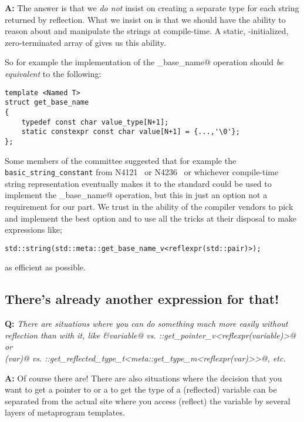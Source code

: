 \textbf{A:} The answer is that we {\em do not} insist on creating a separate
type for each string returned by reflection. What we insist on is that we
should have the ability to reason about and manipulate the strings at compile-time.
A static, \verb@constexpr@-initialized, zero-terminated array of \verb@char@s
gives us this ability.

So for example the implementation of the \verb@get_base_name@ operation should
{\em be equivalent} to the following:

\begin{verbatim}
template <Named T>
struct get_base_name
{
	typedef const char value_type[N+1];
	static constexpr const char value[N+1] = {...,'\0'};
};
\end{verbatim}

Some members of the committee suggested that for example the
\texttt{basic\_string\_constant} from N4121~\cite{ISOCPP-N4121} or
N4236~\cite{ISOCPP-N4236} or whichever compile-time
string representation eventually makes it to the standard could
be used to implement the \verb@get_base_name@ operation,
but this in just an option not a requirement for our part.
We trust in the ability of the compiler vendors to pick and
implement the best option and to use all the tricks at their disposal
to make expressions like;

\begin{verbatim}
std::string(std::meta::get_base_name_v<reflexpr(std::pair)>);
\end{verbatim}

as efficient as possible.

\subsection{There's already another expression for that!}

\textbf{Q:} {\em There are situations where you can do something much more
easily without reflection than with it, like \verb@&variable@ vs.
\verb@meta::get_pointer_v<reflexpr(variable)>@ or\\\verb@decltype(var)@ vs.
\verb@meta::get_reflected_type_t<meta::get_type_m<reflexpr(var)>>@, etc.}

\textbf{A:} Of course there are! There are also situations where the decision
that you want to get a pointer to or a to get the type of a (reflected) variable
can be separated from the actual site where you access (reflect) the variable by
several layers of metaprogram templates.

